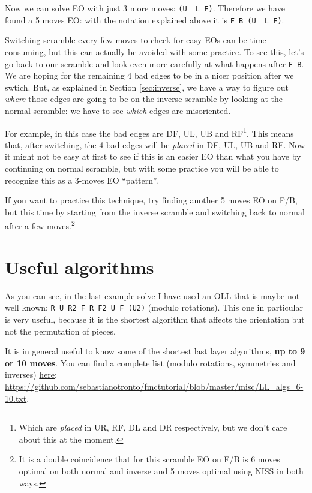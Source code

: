 \documentclass[11pt,a4paper]{book}
\newcommand{\p}{\textquotesingle}
\newcommand{\m}{\texttt}
\newcommand{\ps}{\p\,\,}
\begin{document}
Now we can solve EO with just 3 more moves: \m{(U\ps L F)}. Therefore we have found a 5 moves EO: with the notation explained above it is \m{F B (U\ps L F)}.

Switching scramble every few moves to check for easy EOs can be time consuming, but this can actually be avoided with some practice. To see this, let's go back to our scramble and look even more carefully at what happens after \m{F B}. We are hoping for the remaining 4 bad edges to be in a nicer position after we swtich. But, as explained in Section \ref{sec:inverse}, we have a way to figure out \emph{where} those edges are going to be on the inverse scramble by looking at the normal scramble: we have to see \emph{which} edges are misoriented.

For example, in this case the bad edges are DF, UL, UB and RF\footnote{Which are \emph{placed} in UR, RF, DL and DR respectively, but we don't care about this at the moment.}. This means that, after switching, the 4 bad edges will be \emph{placed} in DF, UL, UB and RF. Now it might not be easy at first to see if this is an easier EO than what you have by continuing on normal scramble, but with some practice you will be able to recognize this as a 3-moves EO ``pattern''.

If you want to practice this technique, try finding another 5 moves EO on F/B, but this time by starting from the inverse scramble and switching back to normal after a few moves.\footnote{It is a double coincidence that for this scramble EO on F/B is 6 moves optimal on both normal and inverse and 5 moves optimal using NISS in both ways.}


\section{Useful algorithms}

As you can see, in the last example solve I have used an OLL that is maybe not well known: \m{R U R2 F R F2 U F (U2)} (modulo rotations). This one in particular is very useful, because it is the shortest algorithm that affects the orientation but not the permutation of pieces.

It is in general useful to know some of the shortest last layer algorithms, \textbf{up to 9 or 10 moves}. You can find a complete list (modulo rotations, symmetries and inverses) \href{https://github.com/sebastianotronto/fmctutorial/blob/master/misc/LL_algs_6-10.txt}{here}: \url{https://github.com/sebastianotronto/fmctutorial/blob/master/misc/LL_algs_6-10.txt}.
\end{document}
